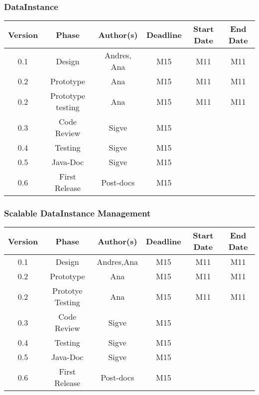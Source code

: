 \subsubsection*{DataInstance}


\begin{table}[H]
\begin{tabular}{cccccc}
\hline
\textbf{Version} & \textbf{Phase} & \textbf{Author(s)} & \textbf{Deadline} & \textbf{Start Date} & \textbf{End Date}\\
\hline
0.1 & Design & Andres, Ana & M15 & M11 & M11\\
\hline 
0.2 & Prototype & Ana & M15 & M11 & M11\\
\hline 
0.2 & Prototype testing & Ana & M15 & M11 & M11\\
\hline 
0.3 & Code Review & Sigve & M15 &  & \\
\hline 
0.4 & Testing & Sigve & M15 & & \\
\hline 
0.5 & Java-Doc  & Sigve & M15 &  & \\
\hline 
0.6 & First Release & Post-docs & M15 &  & \\
\hline
\end{tabular}
\end{table}

\subsubsection*{Scalable DataInstance Management}

\begin{table}[H]
\begin{tabular}{cccccc}
\hline
\textbf{Version} & \textbf{Phase} & \textbf{Author(s)} & \textbf{Deadline} & \textbf{Start Date} & \textbf{End Date}\\
\hline
0.1 & Design & Andres,Ana & M15 & M11 & M11\\
\hline 
0.2 & Prototype & Ana & M15 & M11 & M11\\
\hline 
0.2& Prototye Testing & Ana & M15 & M11 & M11\\
\hline 
0.3 & Code Review & Sigve & M15 &  & \\
\hline 
0.4 & Testing & Sigve & M15 &  & \\
\hline 
0.5 & Java-Doc  & Sigve & M15 &  & \\
\hline 
0.6 & First Release & Post-docs & M15 &  & \\
\hline
\end{tabular}
\end{table}